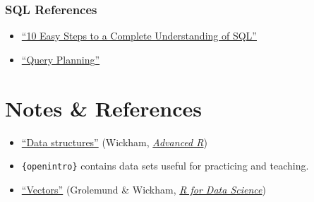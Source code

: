\documentclass[
]{book}
\newenvironment{Shaded}{\begin{snugshade}}{\end{snugshade}}
\newcommand{\CommentTok}[1]{\textcolor[rgb]{0.56,0.35,0.01}{\textit{#1}}}
\newcommand{\ControlFlowTok}[1]{\textcolor[rgb]{0.13,0.29,0.53}{\textbf{#1}}}
\newcommand{\KeywordTok}[1]{\textcolor[rgb]{0.13,0.29,0.53}{\textbf{#1}}}
\newcommand{\NormalTok}[1]{#1}
\newcommand{\OperatorTok}[1]{\textcolor[rgb]{0.81,0.36,0.00}{\textbf{#1}}}
\newcommand{\StringTok}[1]{\textcolor[rgb]{0.31,0.60,0.02}{#1}}
\providecommand{\tightlist}{%
  \setlength{\itemsep}{0pt}\setlength{\parskip}{0pt}}
\begin{document}
\begin{Shaded}
\end{Shaded}

\hypertarget{sql-references}{%
\subsubsection{SQL References}\label{sql-references}}

\begin{itemize}
\tightlist
\item
  \href{https://blog.jooq.org/2016/03/17/10-easy-steps-to-a-complete-understanding-of-sql/}{``10 Easy Steps to a Complete Understanding of SQL''}
\item
  \href{https://www.sqlite.org/queryplanner.html}{``Query Planning''}
\end{itemize}

\hypertarget{notes-references}{%
\section{Notes \& References}\label{notes-references}}

\begin{itemize}
\tightlist
\item
  \href{http://adv-r.had.co.nz/Data-structures.html}{``Data structures''} (Wickham, \href{http://adv-r.had.co.nz/}{\emph{Advanced R}})
\item
  \texttt{\{openintro\}} contains data sets useful for practicing and teaching.
\item
  \href{https://r4ds.had.co.nz/vectors.html}{``Vectors''} (Grolemund \& Wickham, \href{https://r4ds.had.co.nz/}{\emph{R for Data Science}})
\end{itemize}
\end{document}
